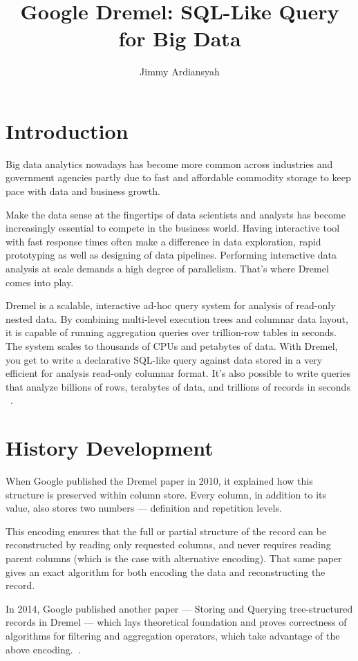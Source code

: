 \documentclass[9pt,twocolumn,twoside]{../../styles/osajnl}
\title{Google Dremel: SQL-Like Query for  Big Data}
\author[1,*]{Jimmy Ardiansyah}
\affil[1]{School of Informatics and Computing, Bloomington, IN 47408, U.S.A.}
\affil[*]{jardians@indiana.edu - S17-IR-2002}
\begin{document}
\maketitle



\section{Introduction}
Big data analytics nowadays has become more common across industries and government agencies partly due to fast and affordable commodity storage to keep pace with data and business growth.  

Make the data sense at the fingertips of data scientists and analysts has become increasingly essential to compete in the business world. Having interactive tool with fast response times often make a difference in data exploration, rapid prototyping as well as designing of data pipelines. Performing interactive data analysis at scale demands a high degree of parallelism. That's where Dremel comes into play.

Dremel is a scalable, interactive ad-hoc query system for analysis of read-only nested data. By combining multi-level execution trees and columnar data layout, it is capable of running aggregation queries over trillion-row tables in seconds.  The system scales to thousands of CPUs and petabytes of data.  With Dremel, you get to write a declarative SQL-like query against data stored in a very efficient for analysis read-only columnar format. It's also possible to write queries that analyze billions of rows, terabytes of data, and trillions of records in seconds ~\cite{paper-dremel}. 

\section{History Development}
When Google published the Dremel paper in 2010, it explained how this structure is preserved within column store. Every column, in addition to its value, also stores two numbers — definition and repetition levels.

This encoding ensures that the full or partial structure of the record can be reconstructed by reading only requested columns, and never requires reading parent columns (which is the case with alternative encoding). That same paper gives an exact algorithm for both encoding the data and reconstructing the record.

In 2014, Google published another paper — Storing and Querying tree-structured records in Dremel — which lays theoretical foundation and proves correctness of algorithms for filtering and aggregation operators, which take advantage of the above encoding.~\cite{www-dremel}.
\end{document}
